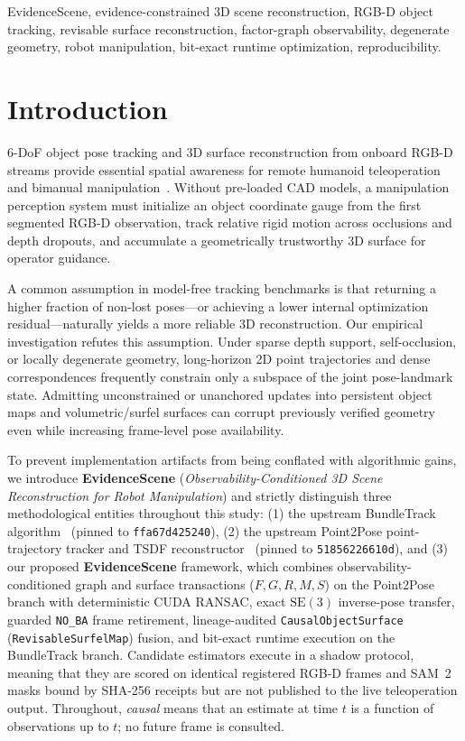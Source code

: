 \documentclass[10pt,journal]{IEEEtran}
\begin{document}
\begin{IEEEkeywords}\normalfont
EvidenceScene, evidence-constrained 3D scene reconstruction, RGB-D object tracking, revisable surface reconstruction, factor-graph observability, degenerate geometry, robot manipulation, bit-exact runtime optimization, reproducibility.
\end{IEEEkeywords}

\section{Introduction}
\label{sec:intro}

 6-DoF object pose tracking and 3D surface reconstruction from onboard RGB-D streams provide essential spatial awareness for remote humanoid teleoperation and bimanual manipulation~\cite{bundletrack,bundlesdf,point2pose}. Without pre-loaded CAD models, a manipulation perception system must initialize an object coordinate gauge from the first segmented RGB-D observation, track relative rigid motion across occlusions and depth dropouts, and accumulate a geometrically trustworthy 3D surface for operator guidance.

A common assumption in model-free tracking benchmarks is that returning a higher fraction of non-lost poses---or achieving a lower internal optimization residual---naturally yields a more reliable 3D reconstruction. Our empirical investigation refutes this assumption. Under sparse depth support, self-occlusion, or locally degenerate geometry, long-horizon 2D point trajectories and dense correspondences frequently constrain only a subspace of the joint pose-landmark state. Admitting unconstrained or unanchored updates into persistent object maps and volumetric/surfel surfaces can corrupt previously verified geometry even while increasing frame-level pose availability.

To prevent implementation artifacts from being conflated with algorithmic gains, we introduce \textbf{EvidenceScene} (\emph{Observability-Conditioned 3D Scene Reconstruction for Robot Manipulation}) and strictly distinguish three methodological entities throughout this study: (1) the upstream BundleTrack algorithm~\cite{bundletrack} (pinned to \texttt{ffa67d425240}), (2) the upstream Point2Pose point-trajectory tracker and TSDF reconstructor~\cite{point2pose} (pinned to \texttt{51856226610d}), and (3) our proposed \textbf{EvidenceScene} framework, which combines observability-conditioned graph and surface transactions ($F,G,R,M,S$) on the Point2Pose branch with deterministic CUDA RANSAC, exact $\mathrm{SE}(3)$ inverse-pose transfer, guarded \texttt{NO\_BA} frame retirement, lineage-audited \texttt{CausalObjectSurface} (\texttt{RevisableSurfelMap}) fusion, and bit-exact runtime execution on the BundleTrack branch. Candidate estimators execute in a shadow protocol, meaning that they are scored on identical registered RGB-D frames and SAM~2~\cite{ravi2024sam2} masks bound by SHA-256 receipts but are not published to the live teleoperation output. Throughout, \emph{causal} means that an estimate at time $t$ is a function of observations up to $t$; no future frame is consulted.
\end{document}

